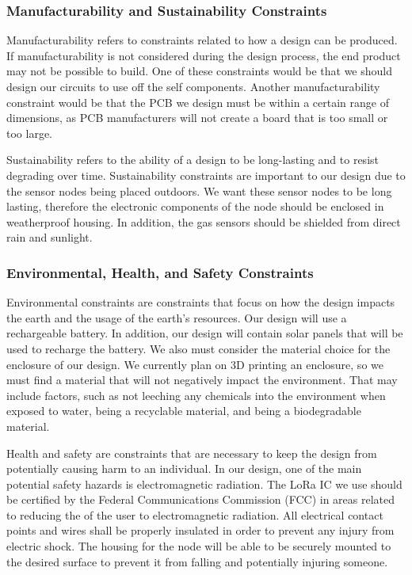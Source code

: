 \subsubsection{Manufacturability and Sustainability Constraints}
Manufacturability refers to constraints related to how a design can be produced. If manufacturability is not considered during the design process, the end product may not be possible to build. One of these constraints would be that we should design our circuits to use off the self components. Another manufacturability constraint would be that the PCB we design must be within a certain range of dimensions, as PCB manufacturers will not create a board that is too small or too large.

Sustainability refers to the ability of a design to be long-lasting and to resist degrading over time. Sustainability constraints are important to our design due to the sensor nodes being placed outdoors. We want these sensor nodes to be long lasting, therefore the electronic components of the node should be enclosed in weatherproof housing. In addition, the gas sensors should be shielded from direct rain and sunlight.

\subsubsection{Environmental, Health, and Safety Constraints}
Environmental constraints are constraints that focus on how the design impacts the earth and the usage of the earth's resources. Our design will use a rechargeable battery. In addition, our design will contain solar panels that will be used to recharge the battery. We also must consider the material choice for the enclosure of our design. We currently plan on 3D printing an enclosure, so we must find a material that will not negatively impact the environment. That may include factors, such as not leeching any chemicals into the environment when exposed to water, being a recyclable material, and being a biodegradable material.

Health and safety are constraints that are necessary to keep the design from potentially causing harm to an individual. In our design, one of the main potential safety hazards is electromagnetic radiation. The LoRa IC we use should be certified by the Federal Communications Commission (FCC) in areas related to reducing the of the user to electromagnetic radiation. All electrical contact points and wires shall be properly insulated in order to prevent any injury from electric shock. The housing for the node will be able to be securely mounted to the desired surface to prevent it from falling and potentially injuring someone.

